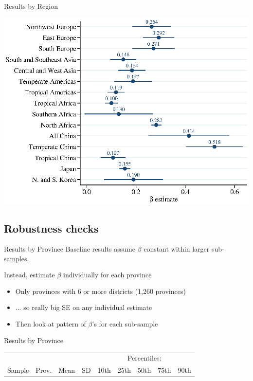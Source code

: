 \documentclass[10pt, xcolor=dvipsnames]{beamer}
\begin{document}
\begin{frame}{Results by Region}
\begin{center}
\includegraphics[width=.8\textwidth]{fig_coef_subregion_base.eps}
\end{center}
\end{frame}


\subsection{Robustness checks}

\begin{frame}{Results by Province}\label{prov}
Baseline results assume $\beta$ constant within larger sub-samples. 

\vspace{.2cm}Instead, estimate $\beta$ individually for each province
\begin{itemize}
  \item Only provinces with 6 or more districts (1,260 provinces)
  \item ... so really big SE on any individual estimate
  \item Then look at pattern of $\beta$'s for each sub-sample
\end{itemize}
\end{frame}

\begin{frame}{Results by Province}

{\scriptsize
\begin{tabularx}{\textwidth}{lrrrXXXXX}
\midrule
           &       &      &     & \multicolumn{5}{c}{Percentiles:} \\ \cmidrule{5-9}
Sample & Prov. & Mean & SD  & 10th    & 25th    & 50th & 75th & 90th \\
\midrule

\midrule
\end{tabularx}
}

\hfill \hyperlink{robustness}{}
\end{frame}
\end{document}
